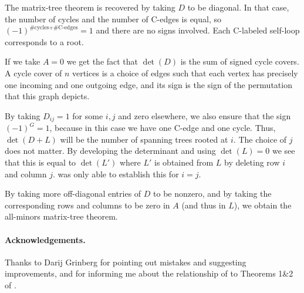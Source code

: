\documentclass[a4paper, 11pt]{article}
\theoremstyle{definition}
\begin{document}
The matrix-tree theorem is recovered by taking $D$ to be diagonal. In that case, the number of cycles and the number of C-edges is equal, so $(-1)^{\text{\#cycles} + \text{\#C-edges}} = 1$ and there are no signs involved. Each C-labeled self-loop corresponds to a root.

If we take $A=0$ we get the fact that $\det(D)$ is the sum of signed cycle covers. A cycle cover of $n$ vertices is a choice of edges such that each vertex has precisely one incoming and one outgoing edge, and its sign is the sign of the permutation that this graph depicts.

By taking $D_{ij} = 1$ for some $i,j$ and zero elsewhere, we also ensure that the sign $(-1)^G = 1$, because in this case we have one C-edge and one cycle. Thus, $\det(D+L)$ will be the number of spanning trees rooted at $i$. The choice of $j$ does not matter. By developing the determinant and using $\det(L) = 0$ we see that this is equal to $\det(L')$ where $L'$ is obtained from $L$ by deleting row $i$ and column $j$.  was only able to establish this for $i = j$.

By taking more off-diagonal entries of $D$ to be nonzero, and by taking the corresponding rows and columns to be zero in $A$ (and thus in $L$), we obtain the all-minors matrix-tree theorem.

\paragraph{Acknowledgements.}
Thanks to Darij Grinberg for pointing out mistakes and suggesting improvements, and for informing me about the relationship of  to Theorems 1\&2 of \cite{Rote2001}.



\end{document}
